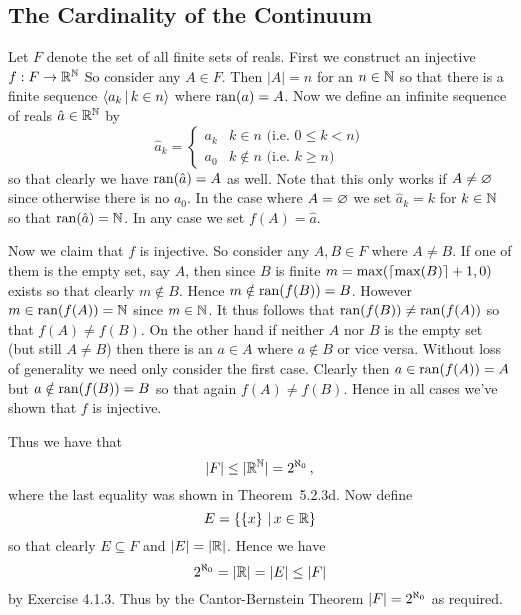 \subsection{The Cardinality of the Continuum}
\begin{solution}
	Let $F$ denote the set of all finite sets of reals.
    First we construct an injective $f: F \to \mathbb{R}^{\mathbb{N}}$
    So consider any $A \in F$.
    Then $|A|=n$ for an $n \in \mathbb{N}$ so that there is a finite sequence $\left\langle a_k \,|\, k \in n \right\rangle$ where $\mathrm{ran}(a) = A$.
    Now we define an infinite sequence of reals $\hat{a} \in \mathbb{R}^{\mathbb{N}}$ by
    $$
    \hat{a}_k = \begin{cases}
    	a_k & k \in n \,\, \text{(i.e. $0 \leq k < n$)} \\
        a_0 & k \notin n \,\, \text{(i.e. $k \geq n$)}
    \end{cases}
    $$
    so that clearly we have $\mathrm{ran}(\hat{a}) = A$ as well.
    Note that this only works if $A \neq \varnothing$ since otherwise there is no $a_0$.
    In the case  where $A = \varnothing$ we set $\hat{a}_k = k$ for $k \in \mathbb{N}$ so that $\mathrm{ran}(\hat{a}) = \mathbb{N}$.
    In any case we set $f(A) = \hat{a}$.

    Now we claim that $f$ is injective.
    So consider any $A,B \in F$ where $A \neq B$.
    If one of them is the empty set, say $A$, then since $B$ is finite $m = \max(\left\lceil \max(B) \right\rceil + 1, 0)$ exists so that clearly $m \notin B$.
    Hence $m \notin \mathrm{ran}(f(B)) = B$.
    However $m \in \mathrm{ran}(f(A)) = \mathbb{N}$ since $m \in \mathbb{N}$.
    It thus follows that $\mathrm{ran}(f(B)) \neq \mathrm{ran}(f(A))$ so that $f(A) \neq f(B)$.
    On the other hand if neither $A$ nor $B$ is the empty set (but still $A \neq B$) then there is an $a \in A$ where $a \notin B$ or vice versa.
    Without loss of generality we need only consider the first case.
    Clearly then $a \in \mathrm{ran}(f(A)) = A$ but $a \notin \mathrm{ran}(f(B)) = B$ so that again $f(A) \neq f(B)$.
    Hence in all cases we've shown that $f$ is injective.

    Thus we have that
    $$
    |F| \leq |\mathbb{R}^{\mathbb{N}}| = {2^{\aleph_0}} \,,
    $$
    where the last equality was shown in Theorem~5.2.3d.
    Now define
    $$
    E = \left\{ \left\{ x \right\} \,|\, x \in \mathbb{R} \right\}
    $$
    so that clearly $E \subseteq F$ and $|E| = |\mathbb{R}|$.
    Hence we have
    $$
    {2^{\aleph_0}} = |\mathbb{R}| = |E| \leq |F|
    $$
    by Exercise 4.1.3.
    Thus by the Cantor-Bernstein Theorem $|F| = {2^{\aleph_0}}$ as required. \qedsymbol
\end{solution}


